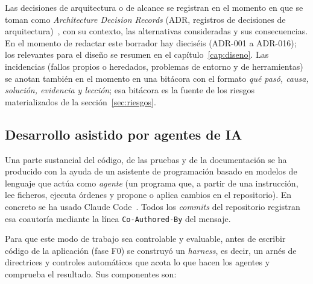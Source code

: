 Las decisiones de arquitectura o de alcance se registran en el momento en que
se toman como \textit{Architecture Decision Records} (ADR, registros de
decisiones de arquitectura)~\cite{nygard2011adr}, con su contexto, las
alternativas consideradas y sus consecuencias. En el momento de redactar este
borrador hay dieciséis (ADR-001 a ADR-016); los relevantes para el diseño se
resumen en el capítulo~\ref{cap:diseno}. Las incidencias (fallos propios o
heredados, problemas de entorno y de herramientas) se anotan también en el
momento en una bitácora con el formato \emph{qué pasó, causa, solución,
evidencia y lección}; esa bitácora es la fuente de los riesgos materializados
de la sección~\ref{sec:riesgos}.

\subsection{Desarrollo asistido por agentes de IA}
\label{sec:metodologia-ia}


Una parte sustancial del código, de las pruebas y de la documentación se ha
producido con la ayuda de un asistente de programación basado en modelos de
lenguaje que actúa como \textit{agente} (un programa que, a partir de una
instrucción, lee ficheros, ejecuta órdenes y propone o aplica cambios en el
repositorio). En concreto se ha usado Claude Code~\cite{claudecode}. Todos los
\textit{commits} del repositorio registran esa coautoría mediante la línea
\texttt{Co-Authored-By} del mensaje.

Para que este modo de trabajo sea controlable y evaluable, antes de escribir
código de la aplicación (fase F0) se construyó un \textit{harness}, es decir,
un arnés de directrices y controles automáticos que acota lo que hacen los
agentes y comprueba el resultado. Sus componentes son:

